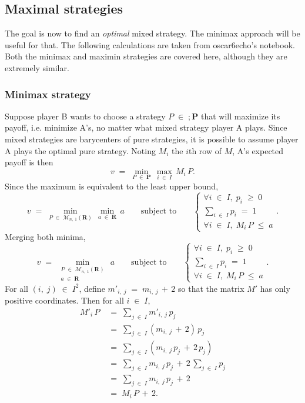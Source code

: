\documentclass{report}
\theoremstyle{definition}
\theoremstyle{plain}
\begin{document}
\subsection{Maximal strategies}
The goal is now to find an \emph{optimal} mixed strategy. The minimax approach
will be useful for that. The following calculations are taken from oscar6echo's
notebook\cite{oscar6echo}. Both the minimax and maximin strategies are covered
here, although they are extremely similar.

\subsubsection{Minimax strategy}
Suppose player B wants to choose a strategy $P\;\in\;;\mathbf P$ that will
maximize its payoff, i.e. minimize A's, no matter what mixed strategy player A
plays. Since mixed strategies are barycenters of pure strategies, it is
possible to assume player A plays the optimal pure strategy. Noting $M_i$ the
$i$th row of $M$, A's expected payoff is then
\[v\;=\;\min_{P\;\in\;\mathbf P}\,\max_{i\;\in\;I}\,M_i\,P.\]
Since the maximum is equivalent to the least upper bound,
\[
	v\;=\;\min_{P\;\in\;\mathscr M_{n,\;1}\left(\mathbf R\right)}\,\min_{a\;\in\;\mathbf R}\,a
		\qquad\text{subject to}\qquad
		\begin{cases}
		\forall i\;\in\;I,\;p_i\;\geqslant\;0 \\
		\sum_{i\;\in\;I}p_i\;=\;1 \\
		\forall i\;\in\;I,\;M_i\,P\;\leqslant\;a
		\end{cases}.
\]
Merging both minima,
\begin{equation}
	v\;=\;\min_{\substack{P\;\in\;\mathscr M_{n,\;1}\left(\mathbf R\right)\\a\;\in\;\mathbf R}}\,a
		\qquad\text{subject to}\qquad
		\begin{cases}
		\forall i\;\in\;I,\;p_i\;\geqslant\;0 \\
		\sum_{i\;\in\;I}p_i\;=\;1 \\
		\forall i\;\in\;I,\;M_i\,P\;\leqslant\;a
		\end{cases}.
	\label{eqn:minimax_1}
\end{equation}
For all $\left(i,\;j\right)\;\in\;I^2$, define $m'_{i,\;j}\;=\;m_{i,\;j}\,+\,2$
so that the matrix $M'$ has only positive coordinates. Then for all $i\;\in\;I$,
\begin{align*}
	M'_i\,P\;&=\;\sum_{j\;\in\;I}m'_{i,\;j}\,p_j \\
		&=\;\sum_{j\;\in\;I}\left(m_{i,\;j}\,+\,2\right)\,p_j \\
		&=\;\sum_{j\;\in\;I}\left(m_{i,\;j}\,p_j\,+\,2\,p_j\right) \\
		&=\;\sum_{j\;\in\;I}m_{i,\;j}\,p_j\,+\,2\,\sum_{j\;\in\;I}p_j \\
		&=\;\sum_{j\;\in\;I}m_{i,\;j}\,p_j\,+\,2 \\
		&=\;M_i\,P\,+\,2.
\end{align*}
\end{document}

